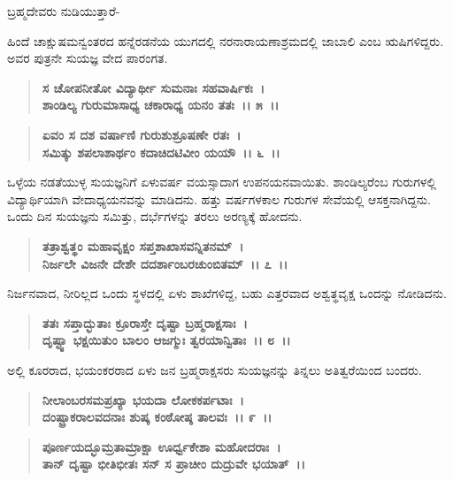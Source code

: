 \begin{flushleft}
ಬ್ರಹ್ಮದೇವರು ನುಡಿಯುತ್ತಾರೆ-
\end{flushleft}

ಹಿಂದೆ ಚಾಕ್ಷುಷಮನ್ವಂತರದ ಹನ್ನೆರಡನೆಯ ಯುಗದಲ್ಲಿ ನರನಾರಾಯಣಾಶ್ರಮದಲ್ಲಿ ಜಾಬಾಲಿ ಎಂಬ ಋಷಿಗಳಿದ್ದರು. ಅವರ ಪುತ್ರನೇ ಸುಯಜ್ಞ ವೇದ ಪಾರಂಗತ.

\begin{verse}
\textbf{ಸ ಚೋಪನೀತೋ ವಿದ್ಯಾರ್ಥೀ ಸುಮನಾಃ ಸಹವಾರ್ಷಿಕಃ~।}\\\textbf{ಶಾಂಡಿಲ್ಯ ಗುರುಮಾಸಾಧ್ಯ ಚಕಾರಾಧ್ಯ ಯನಂ ತತಃ~।। ೫~।। }
\end{verse}

\begin{verse}
\textbf{ಏವಂ ಸ ದಶ ವರ್ಷಾಣಿ ಗುರುಶುಶ್ರೂಷಣೇ ರತಃ~।}\\\textbf{ಸಮಿತ್ಕು ಶಪಲಾಶಾರ್ಥಂ ಕದಾಚಿದಟಿವೀಂ ಯಯೌ~।। ೬~।।}
\end{verse}

ಒಳ್ಳೆಯ ನಡತೆಯುಳ್ಳ ಸುಯಜ್ಞನಿಗೆ ಏಳುವರ್ಷ ವಯಸ್ಸಾದಾಗ ಉಪನಯನ\-ವಾಯಿತು. ಶಾಂಡಿಲ್ಯರೆಂಬ ಗುರುಗಳಲ್ಲಿ ವಿದ್ಯಾರ್ಥಿಯಾಗಿ ವೇದಾಧ್ಯಯನವನ್ನು ಮಾಡಿದನು. ಹತ್ತು ವರ್ಷಗಳಕಾಲ ಗುರುಗಳ ಸೇವೆಯಲ್ಲಿ ಆಸಕ್ತನಾಗಿದ್ದನು. ಒಂದು ದಿನ ಸುಯಜ್ಞನು ಸಮಿತ್ತು, ದರ್ಭೆಗಳನ್ನು ತರಲು ಅರಣ್ಯಕ್ಕೆ ಹೋದನು.

\begin{verse}
\textbf{ತತ್ರಾಶ್ವತ್ಥಂ ಮಹಾವೃಕ್ಷಂ ಸಪ್ತಶಾಖಾಸವನ್ನಿತನಮ್~।}\\\textbf{ನಿರ್ಜಲೇ ವಿಜನೇ ದೇಶೇ ದದರ್ಶಾಂಬರಚುಂಬಿತಮ್~।। ೭~।।}
\end{verse}

ನಿರ್ಜನವಾದ, ನೀರಿಲ್ಲದ ಒಂದು ಸ್ಥಳದಲ್ಲಿ ಏಳು ಶಾಖೆಗಳಿದ್ದ, ಬಹು ಎತ್ತರವಾದ ಅಶ್ವತ್ಥವೃಕ್ಷ ಒಂದನ್ನು ನೋಡಿದನು.

\begin{verse}
\textbf{ತತಃ ಸಪ್ತಾದ್ಭುತಾಃ ಕ್ರೂರಾಸ್ತೇ ದೃಷ್ಟಾ ಬ್ರಹ್ಮರಾಕ್ಷಸಾಃ~।}\\\textbf{ದೃಷ್ಟ್ವಾ ಭಕ್ಷಯಿತುಂ ಬಾಲಂ ಆಜಗ್ಮುಃ ತ್ವರಯಾನ್ವಿತಾಃ~।। ೮~।।}
\end{verse}

ಅಲ್ಲಿ ಕೂರರಾದ, ಭಯಂಕರರಾದ ಏಳು ಜನ ಬ್ರಹ್ಮರಾಕ್ಷಸರು ಸುಯಜ್ಞನನ್ನು ತಿನ್ನಲು ಅತಿತ್ವರೆಯಿಂದ ಬಂದರು.

\begin{verse}
\textbf{ನೀಲಾಂಬರಸಮಪ್ರಖ್ಯಾ ಭಯದಾ ಲೋಕಕರ್ಪಟಾಃ~।}\\\textbf{ದಂಷ್ಟ್ರಾಕರಾಲವದನಾಃ ಶುಷ್ಕ ಕಂಠೋಷ್ಠ ತಾಲವಃ~।। ೯~।।} 
\end{verse}

\begin{verse}
\textbf{ಪೂರ್ಣಯದ್ಭೂಮ್ರತಾಮ್ರಾಕ್ಷಾ ಊರ್ಧ್ವಕೇಶಾ ಮಹೋದರಾಃ~।}\\\textbf{ತಾನ್ ದೃಷ್ಟಾ ಭೀತಿಭೀತಃ ಸನ್ ಸ ಪ್ರಾಚೀಂ ದುದ್ರುವೇ ಭಯಾತ್~।।}
\end{verse}


